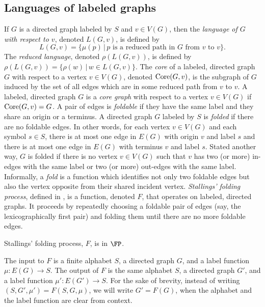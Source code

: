 \documentclass{article}
\newcommand{\Core}{\textnormal{Core}}
\begin{document}
\subsection{Languages of labeled graphs}

If $G$ is a directed graph labeled by $S$ and $v \in V(G)$, then the \emph{language of $G$ with respect to $v$}, denoted $L(G, v)$, is defined by
\begin{equation*}
  L(G, v) = \{ \mu(p) \, | \, p \text{ is a reduced path in } G \text{ from } v \text{ to } v\}.
\end{equation*}
The \emph{reduced language}, denoted $\rho(L(G, v))$, is defined by $\rho(L(G, v)) = \{ \rho(w) \, | \, w \in L(G, v) \}$.
The \emph{core} of a labeled, directed graph $G$ with respect to a vertex $v \in V(G)$, denoted $\Core(G, v)$, is the subgraph of $G$ induced by the set of all edges which are in some reduced path from $v$ to $v$.
A labeled, directed graph $G$ is a \emph{core graph} with respect to a vertex $v \in V(G)$ if $\Core(G, v) = G$.
A pair of edges is \emph{foldable} if they have the same label and they share an origin or a terminus.
A directed graph $G$ labeled by $S$ is \emph{folded} if there are no foldable edges.
In other words, for each vertex $v \in V(G)$ and each symbol $s \in S$, there is at most one edge in $E(G)$ with origin $v$ and label $s$ and there is at most one edge in $E(G)$ with terminus $v$ and label $s$.
Stated another way, $G$ is folded if there is no vertex $v \in V(G)$ such that $v$ has two (or more) in-edges with the same label or two (or more) out-edges with the same label.
Informally, a \emph{fold} is a function which identifies not only two foldable edges but also the vertex opposite from their shared incident vertex.
\emph{Stallings' folding process}, defined in \autocite[Algorithm~5.4]{stallings83}, is a function, denoted $F$, that operates on labeled, directed graphs.
It proceeds by repeatedly choosing a foldable pair of edges (say, the lexicographically first pair) and folding them until there are no more foldable edges.

\begin{theorem}\label{thm:finfp}
  Stallings' folding process, $F$, is in $\FP$.
\end{theorem}

The input to $F$ is a finite alphabet $S$, a directed graph $G$, and a label function $\mu \colon E(G) \to S$.
The output of $F$ is the same alphabet $S$, a directed graph $G'$, and a label function $\mu' \colon E(G') \to S$.
For the sake of brevity, instead of writing $(S, G', \mu') = F(S, G, \mu)$, we will write $G' = F(G)$, when the alphabet and the label function are clear from context.
\end{document}
